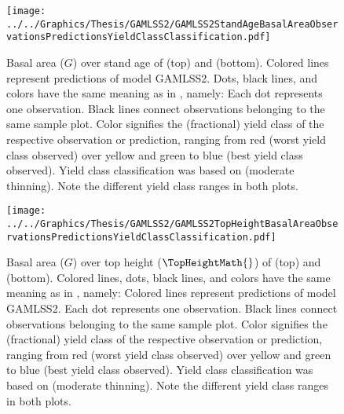 \begin{figure}[h]
  \centering
  \texttt{[image: ../../Graphics/Thesis/GAMLSS2/GAMLSS2StandAgeBasalAreaObservationsPredictionsYieldClassClassification.pdf]}
  \caption{Basal area (\(G\)) over stand age of \Beech{} (top) and \Spruce{} (bottom).  Colored lines represent predictions of model GAMLSS2.  Dots, black lines, and colors have the same meaning as in , namely:  Each dot represents one observation.  Black lines connect observations belonging to the same sample plot.  Color signifies the (fractional) yield class of the respective observation or prediction, ranging from red (worst yield class observed) over yellow and green to blue (best yield class observed). Yield class classification was based on \textcite{Schober1995} (moderate thinning).  Note the different yield class ranges in both plots.}
  \label{fig:GAMLSS2StandAgeBasalAreaObservationsPredictionsYieldClassClassification}
\end{figure}

\begin{figure}[h]
  \centering
  \texttt{[image: ../../Graphics/Thesis/GAMLSS2/GAMLSS2TopHeightBasalAreaObservationsPredictionsYieldClassClassification.pdf]}
  \caption{Basal area (\(G\)) over top height (\(\TopHeightMath{}\)) of \Beech{} (top) and \Spruce{} (bottom).  Colored lines, dots, black lines, and colors have the same meaning as in , namely:  Colored lines represent predictions of model GAMLSS2.  Each dot represents one observation.  Black lines connect observations belonging to the same sample plot.  Color signifies the (fractional) yield class of the respective observation or prediction, ranging from red (worst yield class observed) over yellow and green to blue (best yield class observed). Yield class classification was based on \textcite{Schober1995} (moderate thinning).  Note the different yield class ranges in both plots.}
  \label{fig:GAMLSS2TopHeightBasalAreaObservationsPredictionsYieldClassClassification}
\end{figure}

\clearpage{}

